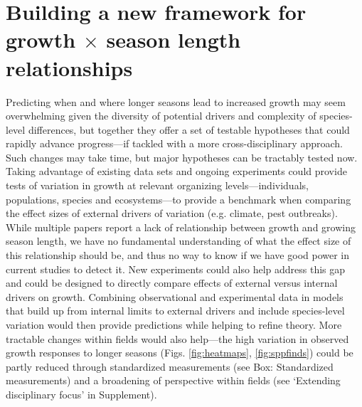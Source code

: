 \documentclass[11pt]{article}
\begin{document}
\section*{Building a new framework for growth $\times$ season length relationships} 
Predicting when and where longer seasons lead to increased growth may seem overwhelming given the diversity of potential drivers and complexity of species-level differences, but together they offer a set of testable hypotheses that could rapidly advance progress---if tackled with a more cross-disciplinary approach. Such changes may take time, but major hypotheses can be tractably tested now. Taking advantage of existing data sets and ongoing experiments could provide tests of variation in growth at relevant organizing levels---individuals, populations, species and ecosystems---to provide a benchmark when comparing the effect sizes of external drivers of variation (e.g. climate, pest outbreaks). While multiple papers report a lack of relationship between growth and growing season length, we have no fundamental understanding of what the effect size of this relationship should be, and thus no way to know if we have good power in current studies to detect it. New experiments could also help address this gap and could be designed to directly compare effects of external versus internal drivers on growth. Combining observational and experimental data in models that build up from internal limits to external drivers and include species-level variation would then provide predictions while helping to refine theory. More tractable changes within fields would also help---the high variation in observed growth responses to longer seasons (Figs. \ref{fig:heatmaps}, \ref{fig:sppfinds}) could be partly reduced through standardized measurements (see Box: Standardized measurements) and a broadening of perspective within fields (see `Extending disciplinary focus' in Supplement). 
\end{document}
